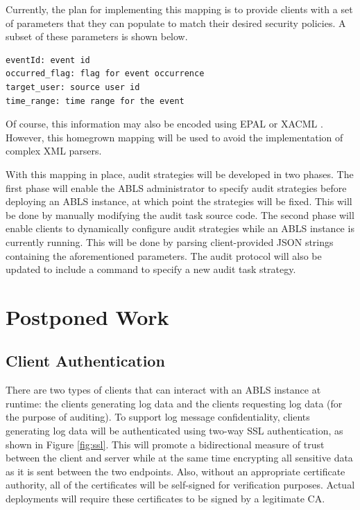\documentclass{sig-alternate}
\begin{document}
Currently, the plan for implementing this mapping is to provide clients with a set of parameters that they can populate to
match their desired security policies. A subset of these parameters is shown below.
\begin{lstlisting}
eventId: event id
occurred_flag: flag for event occurrence
target_user: source user id
time_range: time range for the event
\end{lstlisting}

Of course, this information may also be encoded using EPAL or XACML \cite{Anderson2005-ComparisonEAPL_XACML}.
However, this homegrown mapping will be used to avoid the implementation of complex XML parsers. 

With this mapping in place, audit strategies will be developed in two phases. The first phase will enable the 
ABLS administrator to specify audit strategies before deploying an ABLS instance, at which point the strategies 
will be fixed. This will be done by manually modifying the audit task source code. The second phase will enable 
clients to dynamically configure audit strategies while an ABLS instance is currently running. This will be done 
by parsing client-provided JSON strings containing the aforementioned parameters. The audit protocol will also 
be updated to include a command to specify a new audit task strategy.

\section{Postponed Work}

\subsection{Client Authentication}
\label{sec:auth}
There are two types of clients that can interact with an ABLS instance at runtime: the clients generating log data and the
clients requesting log data (for the purpose of auditing). To support log message confidentiality, clients generating 
log data will be authenticated using two-way SSL authentication, as shown in Figure \ref{fig:ssl}. This will 
promote a bidirectional measure of trust between the client and server while at the same time encrypting 
all sensitive data as it is sent between the two endpoints. Also, without an appropriate certificate authority, all
of the certificates will be self-signed for verification purposes. Actual deployments will require these certificates
to be signed by a legitimate CA.
\end{document}
